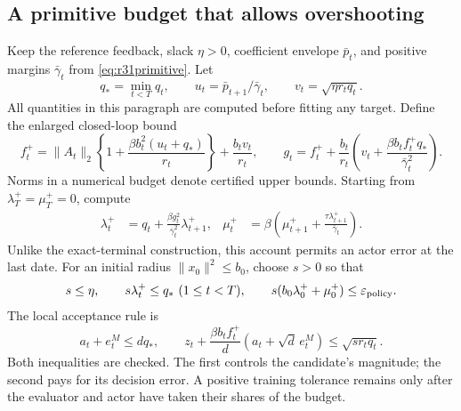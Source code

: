 \documentclass[ecta,nameyear,draft]{econsocart}
\theoremstyle{definition}
\theoremstyle{remark}
\begin{document}
\subsection{A primitive budget that allows overshooting}
Keep the reference feedback, slack $\eta>0$, coefficient envelope
$\bar p_t$, and positive margins $\bar\gamma_t$ from
\eqref{eq:r31primitive}. Let
\[
 q_* = \min_{t<T}q_t,\qquad
 u_t=\bar p_{t+1}/\bar\gamma_t,\qquad
 v_t=\sqrt{\eta r_tq_t}.
\]
All quantities in this paragraph are computed before fitting any target.
Define the enlarged closed-loop bound
\begin{equation}\label{eq:r34f}
 f_t^+=\|A_t\|_2
       \left\{1+\frac{\beta b_t^2(u_t+q_*)}{r_t}\right\}
             +\frac{b_tv_t}{r_t},
 \qquad
 g_t=f_t^++\frac{b_t}{r_t}
       \left(v_t+\frac{\beta b_tf_t^+q_*}{\bar\gamma_t^2}\right).
\end{equation}
Norms in a numerical budget denote certified upper bounds. Starting from
$\lambda_T^+=\mu_T^+=0$, compute
\begin{align}
 \lambda_t^+&=q_t+
       \frac{\beta g_t^2}{\bar\gamma_t^2}\lambda_{t+1}^+,
 &\mu_t^+&=\beta\left(\mu_{t+1}^+
             +\frac{\tau\lambda_{t+1}^+}{\bar\gamma_t}\right).
 \label{eq:r34weights}
\end{align}
Unlike the exact-terminal construction, this account permits an actor error
at the last date. For an initial radius $\|x_0\|^2\leq b_0$, choose $s>0$
so that
\begin{equation}\label{eq:r34allocation}
 s\leq\eta,\qquad s\lambda_t^+\leq q_*\ (1\leq t<T),\qquad
 s(b_0\lambda_0^++\mu_0^+)\leq\varepsilon_{\rm policy}.
\end{equation}
The local acceptance rule is
\begin{equation}\label{eq:r34accept}
 a_t+e_t^M\leq dq_*,\qquad
 z_t+\frac{\beta b_tf_t^+}{d}(a_t+\sqrt d\,e_t^M)
                         \leq\sqrt{s r_tq_t}.
\end{equation}
Both inequalities are checked. The first controls the candidate's magnitude;
the second pays for its decision error. A positive training tolerance remains
only after the evaluator and actor have taken their shares of the budget.
\end{document}
